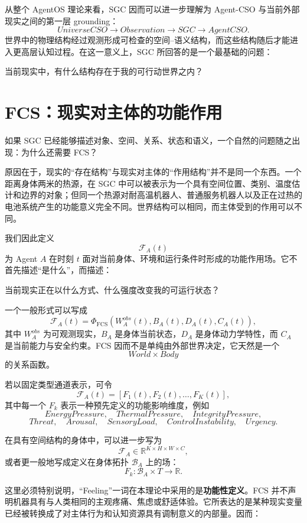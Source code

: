 从整个 AgentOS 理论来看，SGC 因而可以进一步理解为 Agent-CSO 与当前外部现实之间的第一层 grounding：
\[
UniverseCSO
\longrightarrow
Observation
\longrightarrow
SGC
\longrightarrow
AgentCSO.
\]
世界中的物理结构经过观测形成可检查的空间--语义结构，而这些结构随后才能进入更高层认知过程。在这一意义上，SGC 所回答的是一个最基础的问题：

\begin{statementbox}
当前现实中，有什么结构存在于我的可行动世界之内？
\end{statementbox}


\section{FCS：现实对主体的功能作用}

如果 SGC 已经能够描述对象、空间、关系、状态和语义，一个自然的问题随之出现：为什么还需要 FCS？

原因在于，现实的“存在结构”与现实对主体的“作用结构”并不是同一个东西。一个距离身体两米的热源，在 SGC 中可以被表示为一个具有空间位置、类别、温度估计和边界的对象；但同一个热源对耐高温机器人、普通服务机器人以及正在过热的电池系统产生的功能意义完全不同。世界结构可以相同，而主体受到的作用可以不同。

我们因此定义
\[
\mathcal F_A(t)
\]
为 Agent $A$ 在时刻 $t$ 面对当前身体、环境和运行条件时形成的功能作用场。它不首先描述“是什么”，而描述：
\begin{statementbox}
当前现实正在以什么方式、什么强度改变我的可运行状态？
\end{statementbox}

一个一般形式可以写成
\[
\mathcal F_A(t)
=
\Phi_{\mathrm{FCS}}
\left(
W_A^{obs}(t),
B_A(t),
D_A(t),
C_A(t)
\right),
\]
其中 $W_A^{obs}$ 为可观测现实，$B_A$ 是身体当前状态，$D_A$ 是身体动力学特性，而 $C_A$ 是当前能力与安全约束。FCS 因而不是单纯由外部世界决定，它天然是一个
\[
World\times Body
\]
的关系函数。

若以固定类型通道表示，可令
\[
\mathcal F_A(t)
=
\left[
F_1(t),
F_2(t),
\ldots,
F_K(t)
\right],
\]
其中每一个 $F_k$ 表示一种预先定义的功能影响维度，例如
\[
EnergyPressure,\quad
ThermalPressure,\quad
IntegrityPressure,
\]
\[
Threat,\quad
Arousal,\quad
SensoryLoad,\quad
ControlInstability,\quad
Urgency.
\]

在具有空间结构的身体中，可以进一步写为
\[
\mathcal F_A
\in
\mathbb R^{K\times H\times W\times C},
\]
或者更一般地写成定义在身体拓扑 $\mathcal B_A$ 上的场：
\[
F_k:
\mathcal B_A\times T
\rightarrow
\mathbb R.
\]

这里必须特别说明，“Feeling”一词在本理论中采用的是\textbf{功能性定义}。FCS 并不声明机器具有与人类相同的主观疼痛、焦虑或舒适体验。它所表达的是某种现实变量已经被转换成了对主体行为和认知资源具有调制意义的内部量。因而：
\begin{statementbox}
\centering
{}
\end{statementbox}

